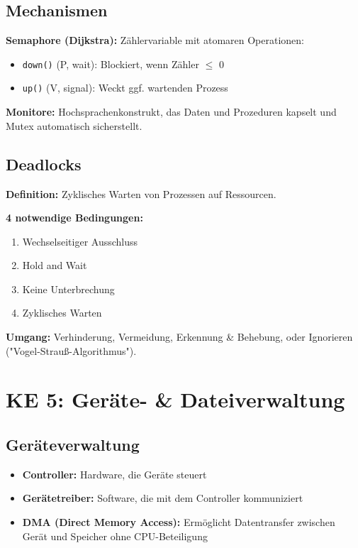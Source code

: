 \documentclass[9pt,a4paper]{extarticle}
\begin{document}
\begin{multicols*}{2}
\subsection{Mechanismen}
\textbf{Semaphore (Dijkstra):} Zählervariable mit atomaren Operationen:
\begin{itemize}
\item \texttt{down()} (P, wait): Blockiert, wenn Zähler $\leq$ 0
\item \texttt{up()} (V, signal): Weckt ggf. wartenden Prozess
\end{itemize}

\textbf{Monitore:} Hochsprachenkonstrukt, das Daten und Prozeduren kapselt und Mutex automatisch sicherstellt.

\subsection{Deadlocks}
\textbf{Definition:} Zyklisches Warten von Prozessen auf Ressourcen.

\textbf{4 notwendige Bedingungen:}
\begin{enumerate}
\item Wechselseitiger Ausschluss
\item Hold and Wait
\item Keine Unterbrechung
\item Zyklisches Warten
\end{enumerate}

\textbf{Umgang:} Verhinderung, Vermeidung, Erkennung \& Behebung, oder Ignorieren ("Vogel-Strauß-Algorithmus").

\section{KE 5: Geräte- \& Dateiverwaltung}

\subsection{Geräteverwaltung}
\begin{itemize}
\item \textbf{Controller:} Hardware, die Geräte steuert
\item \textbf{Gerätetreiber:} Software, die mit dem Controller kommuniziert
\item \textbf{DMA (Direct Memory Access):} Ermöglicht Datentransfer zwischen Gerät und Speicher ohne CPU-Beteiligung
\end{itemize}


\end{multicols*}
\end{document}
